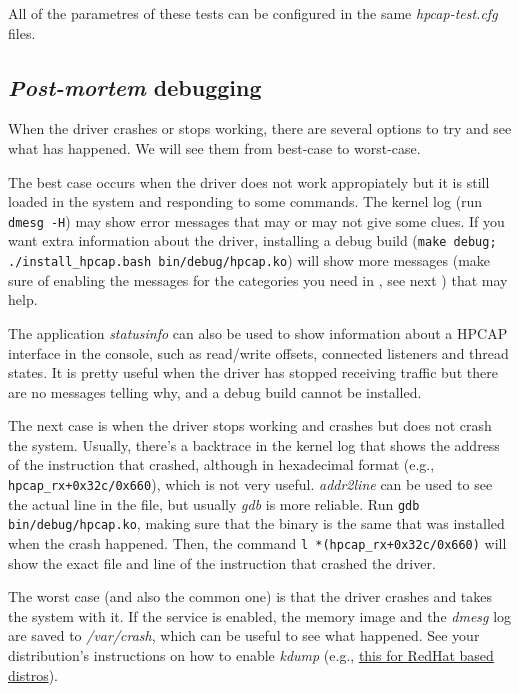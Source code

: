 \documentclass[oneside]{hpman}
\begin{document}
All of the parametres of these tests can be configured in the same \textit{hpcap-test.cfg} files.

\subsection{\textit{Post-mortem} debugging}

When the driver crashes or stops working, there are several options to try and see what has happened. We will see them from best-case to worst-case.

The best case occurs when the driver does not work appropiately but it is still loaded in the system and responding to some commands. The kernel log (run \texttt{dmesg -H}) may show error messages that may or may not give some clues. If you want extra information about the driver, installing a debug build (\texttt{make debug; ./install\_hpcap.bash bin/debug/hpcap.ko}) will show more messages (make sure of enabling the messages for the categories you need in , see next ) that may help.

The application \textit{statusinfo} can also be used to show information about a HPCAP interface in the console, such as read/write offsets, connected listeners and thread states. It is pretty useful when the driver has stopped receiving traffic but there are no messages telling why, and a debug build cannot be installed.

The next case is when the driver stops working and crashes but does not crash the system. Usually, there's a backtrace in the kernel log that shows the address of the instruction that crashed, although in hexadecimal format (e.g., \texttt{hpcap\_rx+0x32c/0x660}), which is not very useful. \textit{addr2line} can be used to see the actual line in the file, but usually \textit{gdb} is more reliable. Run \texttt{gdb bin/debug/hpcap.ko}, making sure that the binary is the same that was installed when the crash happened. Then, the command \texttt{l *(hpcap\_rx+0x32c/0x660)} will show the exact file and line of the instruction that crashed the driver.

The worst case (and also the common one) is that the driver crashes and takes the system with it. If the  service is enabled, the memory image and the \textit{dmesg} log are saved to \textit{/var/crash}, which can be useful to see what happened. See your distribution's instructions on how to enable \textit{kdump} (e.g., \href{https://fedoraproject.org/wiki/How_to_use_kdump_to_debug_kernel_crashes}{this for RedHat based distros}).
\end{document}
